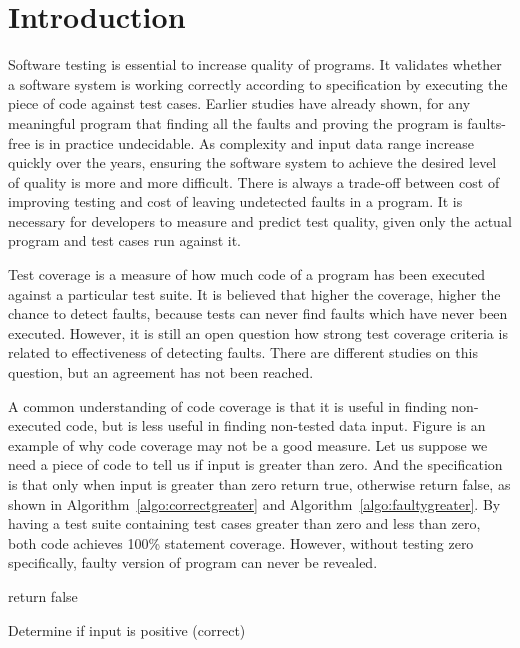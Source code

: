 \section{Introduction}
Software testing is essential to increase quality of programs. It validates whether a software system is working correctly according to specification by executing the piece of code against test cases. Earlier studies have already shown, for any meaningful program that finding all the faults and proving the program is faults-free is in practice undecidable. As complexity and input data range increase quickly over the years, ensuring the software system to achieve the desired level of quality is more and more difficult. There is always a trade-off between cost of improving testing and cost of leaving undetected faults in a program. It is necessary for developers to measure and predict test quality, given only the actual program and test cases run against it.

Test coverage is a measure of how much code of a program has been executed against a particular test suite. It is believed that higher the coverage, higher the chance to detect faults, because tests can never find faults which have never been executed. However, it is still an open question how strong test coverage criteria is related to effectiveness of detecting faults. There are different studies on this question, but an agreement has not been reached.

A common understanding of code coverage is that it is useful in finding non-executed code, but is less useful in finding non-tested data input. Figure is an example of why code coverage may not be a good measure. Let us suppose we need a piece of code to tell us if input is greater than zero. And the specification is that only when input is greater than zero return true, otherwise return false, as shown in Algorithm~\ref{algo:correctgreater} and Algorithm~\ref{algo:faultygreater}. By having a test suite containing test cases greater than zero and less than zero, both code achieves 100\% statement coverage. However, without testing zero specifically, faulty version of program can never be revealed.

\begin{algorithm}[t]	
	{	return false\;
	}
	\caption{Determine if input is positive (correct)}
	\label{algo:correctgreater}
	\bigskip
\end{algorithm}


